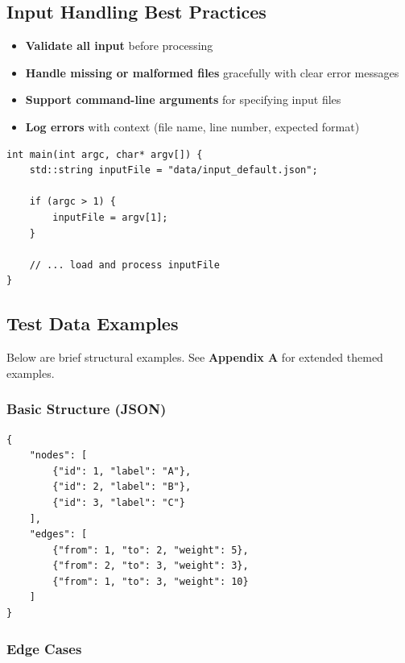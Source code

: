 \subsection{Input Handling Best Practices}

\begin{itemize}
  \item \textbf{Validate all input} before processing
  \item \textbf{Handle missing or malformed files} gracefully with clear error messages
  \item \textbf{Support command-line arguments} for specifying input files
  \item \textbf{Log errors} with context (file name, line number, expected format)
\end{itemize}

\begin{lstlisting}[style=cpp]
int main(int argc, char* argv[]) {
    std::string inputFile = "data/input_default.json";

    if (argc > 1) {
        inputFile = argv[1];
    }

    // ... load and process inputFile
}
\end{lstlisting}

\subsection{Test Data Examples}

Below are brief structural examples. See \textbf{Appendix A} for extended themed examples.

\subsubsection{Basic Structure (JSON)}

\begin{lstlisting}[style=json]
{
    "nodes": [
        {"id": 1, "label": "A"},
        {"id": 2, "label": "B"},
        {"id": 3, "label": "C"}
    ],
    "edges": [
        {"from": 1, "to": 2, "weight": 5},
        {"from": 2, "to": 3, "weight": 3},
        {"from": 1, "to": 3, "weight": 10}
    ]
}
\end{lstlisting}

\subsubsection{Edge Cases}

